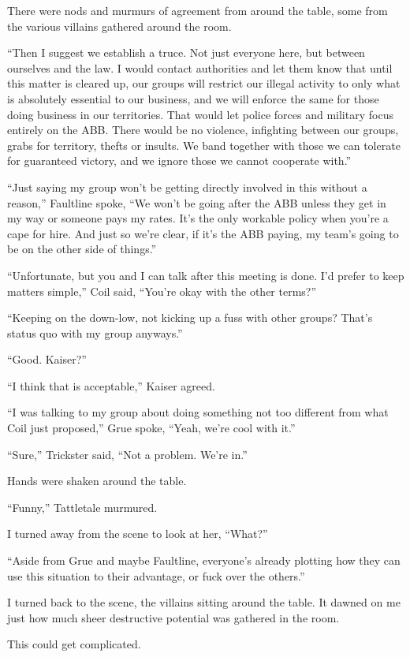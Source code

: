 There were nods and murmurs of agreement from around the table, some from the various villains gathered around the room.



``Then I suggest we establish a truce.  Not just everyone here, but between ourselves and the law.  I would contact authorities and let them know that until this matter is cleared up, our groups will restrict our illegal activity to only what is absolutely essential to our business, and we will enforce the same for those doing business in our territories.  That would let police forces and military focus entirely on the ABB.  There would be no violence, infighting between our groups, grabs for territory, thefts or insults.  We band together with those we can tolerate for guaranteed victory, and we ignore those we cannot cooperate with.''



``Just saying my group won't be getting directly involved in this without a reason,'' Faultline spoke, ``We won't be going after the ABB unless they get in my way or someone pays my rates.  It's the only workable policy when you're a cape for hire.  And just so we're clear, if it's the ABB paying, my team's going to be on the other side of things.''



``Unfortunate, but you and I can talk after this meeting is done.  I'd prefer to keep matters simple,'' Coil said, ``You're okay with the other terms?''



``Keeping on the down-low, not kicking up a fuss with other groups?  That's status quo with my group anyways.''



``Good.  Kaiser?''



``I think that is acceptable,'' Kaiser agreed.



``I was talking to my group about doing something not too different from what Coil just proposed,'' Grue spoke, ``Yeah, we're cool with it.''



``Sure,'' Trickster said, ``Not a problem.  We're in.''



Hands were shaken around the table.



``Funny,'' Tattletale murmured.



I turned away from the scene to look at her, ``What?''



``Aside from Grue and maybe Faultline, everyone's already plotting how they can use this situation to their advantage, or fuck over the others.''



I turned back to the scene, the villains sitting around the table.  It dawned on me just how much sheer destructive potential was gathered in the room.



This could get complicated.





